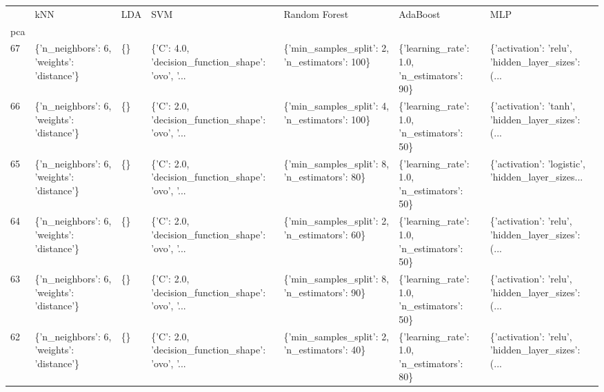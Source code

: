 \begin{tabular}{lllllll}
\toprule
{} &                                        kNN & LDA &                                                SVM &                                  Random Forest &                                     AdaBoost &                                                MLP \\
pca &                                            &     &                                                    &                                                &                                              &                                                    \\
\midrule
67  &  \{'n\_neighbors': 6, 'weights': 'distance'\} &  \{\} &  \{'C': 4.0, 'decision\_function\_shape': 'ovo', '... &  \{'min\_samples\_split': 2, 'n\_estimators': 100\} &   \{'learning\_rate': 1.0, 'n\_estimators': 90\} &  \{'activation': 'relu', 'hidden\_layer\_sizes': (... \\
66  &  \{'n\_neighbors': 6, 'weights': 'distance'\} &  \{\} &  \{'C': 2.0, 'decision\_function\_shape': 'ovo', '... &  \{'min\_samples\_split': 4, 'n\_estimators': 100\} &   \{'learning\_rate': 1.0, 'n\_estimators': 50\} &  \{'activation': 'tanh', 'hidden\_layer\_sizes': (... \\
65  &  \{'n\_neighbors': 6, 'weights': 'distance'\} &  \{\} &  \{'C': 2.0, 'decision\_function\_shape': 'ovo', '... &   \{'min\_samples\_split': 8, 'n\_estimators': 80\} &   \{'learning\_rate': 1.0, 'n\_estimators': 50\} &  \{'activation': 'logistic', 'hidden\_layer\_sizes... \\
64  &  \{'n\_neighbors': 6, 'weights': 'distance'\} &  \{\} &  \{'C': 2.0, 'decision\_function\_shape': 'ovo', '... &   \{'min\_samples\_split': 2, 'n\_estimators': 60\} &   \{'learning\_rate': 1.0, 'n\_estimators': 50\} &  \{'activation': 'relu', 'hidden\_layer\_sizes': (... \\
63  &  \{'n\_neighbors': 6, 'weights': 'distance'\} &  \{\} &  \{'C': 2.0, 'decision\_function\_shape': 'ovo', '... &   \{'min\_samples\_split': 8, 'n\_estimators': 90\} &   \{'learning\_rate': 1.0, 'n\_estimators': 50\} &  \{'activation': 'relu', 'hidden\_layer\_sizes': (... \\
62  &  \{'n\_neighbors': 6, 'weights': 'distance'\} &  \{\} &  \{'C': 2.0, 'decision\_function\_shape': 'ovo', '... &   \{'min\_samples\_split': 2, 'n\_estimators': 40\} &   \{'learning\_rate': 1.0, 'n\_estimators': 80\} &  \{'activation': 'relu', 'hidden\_layer\_sizes': (... \\

\end{tabular}
